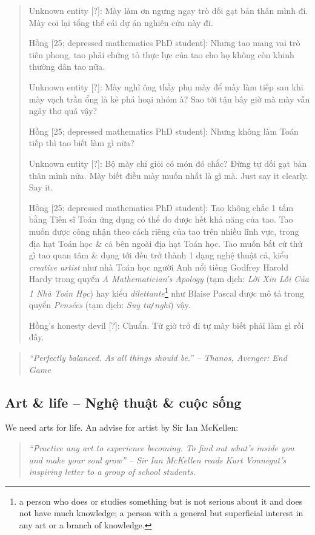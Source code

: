 \documentclass[12pt]{article}
\begin{document}
\begin{quote}
	{\sf Unknown entity [?]}: Mày làm ơn ngưng ngay trò dối gạt bản thân mình đi. Mày coi lại tổng thể cái dự án nghiên cứu này đi.
	
	{\sf Hồng [25; depressed mathematics PhD student]}: Nhưng tao mang vai trò tiên phong, tao phải chứng tỏ thực lực của tao cho họ không còn khinh thường dân tao nữa.
	
	{\sf Unknown entity [?]}: Mày nghĩ ông thầy phụ mày để mày làm tiếp sau khi mày vạch trần ổng là kẻ phá hoại nhóm à? Sao tới tận bây giờ mà mày vẫn ngây thơ quá vậy?
	
	{\sf Hồng [25; depressed mathematics PhD student]}: Nhưng không làm Toán tiếp thì tao biết làm gì nữa?
	
	{\sf Unknown entity [?]}: Bộ mày chỉ giỏi có món đó chắc? Đừng tự dối gạt bản thân mình nữa. Mày biết điều mày muốn nhất là gì mà. Just say it clearly. Say it.
	
	{\sf Hồng [25; depressed mathematics PhD student]}: Tao không chắc 1 tấm bằng Tiến sĩ Toán ứng dụng có thể đo được hết khả năng của tao. Tao muốn được công nhận theo cách riêng của tao trên nhiều lĩnh vực, trong địa hạt Toán học \& cả bên ngoài địa hạt Toán học. Tao muốn bất cứ thứ gì tao quan tâm \& đụng tới đều trở thành 1 dạng nghệ thuật cả, kiểu {\it creative artist} như nhà Toán học người Anh nổi tiếng {\sc Godfrey Harold Hardy} trong quyển {\it A Mathematician's Apology} \cite{Hardy1940,Hardy1992,Hardy2022} (tạm dịch: {\it Lời Xin Lỗi Của 1 Nhà Toán Học}) hay kiểu {\it dilettante}\footnote{\sf a person who does or studies something but is not serious about it and does not have much knowledge; a person with a general but superficial interest in any art or a branch of knowledge.} như {\sc Blaise Pascal} được mô tả trong quyển {\it Pens\'ees} \cite{Pascal2003} (tạm dịch: {\it Suy tư{\tt/}nghĩ}) vậy.
	
	{\sf Hồng's honesty devil [?]}: Chuẩn. Từ giờ trở đi tự mày biết phải làm gì rồi đấy.
\end{quote}

\begin{quote}\it
	``Perfectly balanced. As all things should be.'' -- {\sc Thanos}, Avenger: End Game
\end{quote}



\subsection{Art \& life -- Nghệ thuật \& cuộc sống}
We need arts for life. An advise for artist by Sir {\sc Ian McKellen}:
\begin{quote}\it
	``Practice any art to experience becoming. To find out what's inside you and make your soul grow'' -- Sir {\sc Ian McKellen} reads Kurt Vonnegut's inspiring letter to a group of school students.
\end{quote}
\end{document}
